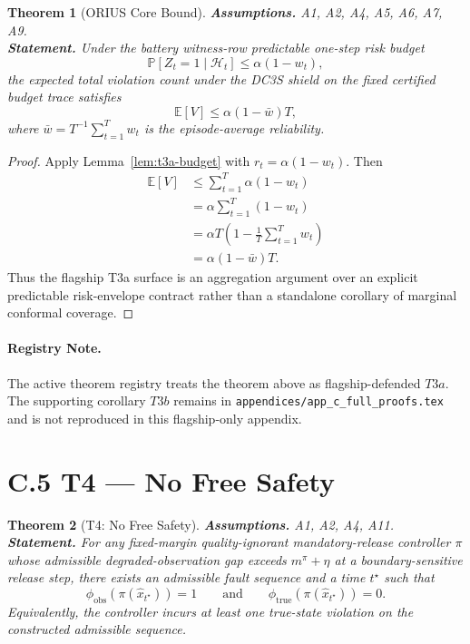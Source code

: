 \documentclass[11pt]{article}
\newtheorem{theorem}{Theorem}
\newcommand{\1}{\mathbf{1}}
\newcommand{\E}{\mathbb{E}}
\newcommand{\Prob}{\mathbb{P}}
\begin{document}
\begin{theorem}[ORIUS Core Bound]\label{thm:t3a}
\textbf{Assumptions.} A1, A2, A4, A5, A6, A7, A9. \\
\textbf{Statement.} Under the battery witness-row predictable one-step risk
budget
\[
  \Prob[Z_t=1\mid\mathcal{H}_t] \le \alpha(1-w_t),
\]
the expected total violation count under the DC3S shield on the fixed certified
budget trace satisfies
\[
  \E[V] \le \alpha(1-\bar w)T,
\]
where $\bar w = T^{-1}\sum_{t=1}^T w_t$ is the episode-average reliability.
\end{theorem}

\begin{proof}
Apply Lemma~\ref{lem:t3a-budget} with $r_t=\alpha(1-w_t)$. Then
\begin{align*}
  \E[V]
  &\le \sum_{t=1}^T \alpha(1-w_t) \\
  &= \alpha \sum_{t=1}^T (1-w_t) \\
  &= \alpha T \left(1 - \frac{1}{T}\sum_{t=1}^T w_t\right) \\
  &= \alpha(1-\bar w)T.
\end{align*}
Thus the flagship T3a surface is an aggregation argument over an explicit
predictable risk-envelope contract rather than a standalone corollary of
marginal conformal coverage. \qedhere
\end{proof}

\paragraph{Registry Note.}
The active theorem registry treats the theorem above as flagship-defended
$T3a$. The supporting corollary $T3b$ remains in
\texttt{appendices/app\_c\_full\_proofs.tex} and is not reproduced in this
flagship-only appendix.

\section*{C.5 T4 --- No Free Safety}

\begin{theorem}[T4: No Free Safety]\label{thm:t4}
\textbf{Assumptions.} A1, A2, A4, A11. \\
\textbf{Statement.} For any fixed-margin quality-ignorant mandatory-release
controller $\pi$ whose admissible degraded-observation gap exceeds
$m^\pi+\eta$ at a boundary-sensitive release step, there exists an admissible
fault sequence and a time $t^\star$ such that
\[
  \phi_{\mathrm{obs}}(\pi(\hat{x}_{t^\star})) = 1
  \qquad\text{and}\qquad
  \phi_{\mathrm{true}}(\pi(\hat{x}_{t^\star})) = 0.
\]
Equivalently, the controller incurs at least one true-state violation on the
constructed admissible sequence.
\end{theorem}
\end{document}
